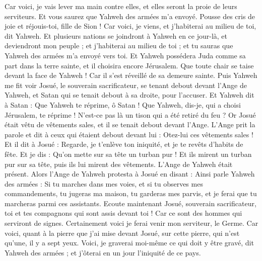 \begin{multicols}{2}
Car voici, je vais lever ma main contre elles, et elles seront la proie de leurs serviteurs. Et vous saurez que Yahweh des armées m'a envoyé.
Pousse des cris de joie et réjouis-toi, fille de Sion ! Car voici, je viens, et j'habiterai au milieu de toi, dit Yahweh.
Et plusieurs nations se joindront à Yahweh en ce jour-là, et deviendront mon peuple ; et j'habiterai au milieu de toi ; et tu sauras que Yahweh des armées m'a envoyé vers toi.
Et Yahweh possédera Juda comme sa part dans la terre sainte, et il choisira encore Jérusalem.
Que toute chair se taise devant la face de Yahweh ! Car il s'est réveillé de sa demeure sainte.
\VerseOne{}Puis Yahweh me fit voir Josué, le souverain sacrificateur, se tenant debout devant l'Ange de Yahweh, et Satan qui se tenait debout à sa droite, pour l'accuser.
Et Yahweh dit à Satan : Que Yahweh te réprime, ô Satan ! Que Yahweh, dis-je, qui a choisi Jérusalem, te réprime ! N'est-ce pas là un tison qui a été retiré du feu ?
Or Josué était vêtu de vêtements sales, et il se tenait debout devant l'Ange.
L'Ange prit la parole et dit à ceux qui étaient debout devant lui : Otez-lui ces vêtements sales ! Et il dit à Josué : Regarde, je t'enlève ton iniquité, et je te revêts d'habits de fête.
Et je dis : Qu'on mette sur sa tête un turban pur ! Et ils mirent un turban pur sur sa tête, puis ils lui mirent des vêtements. L'Ange de Yahweh était présent.
Alors l'Ange de Yahweh protesta à Josué en disant :
Ainsi parle Yahweh des armées : Si tu marches dans mes voies, et si tu observes mes commandements, tu jugeras ma maison, tu garderas mes parvis, et je ferai que tu marcheras parmi ces assistants.
Ecoute maintenant Josué, souverain sacrificateur, toi et tes compagnons qui sont assis devant toi ! Car ce sont des hommes qui serviront de signes. Certainement voici je ferai venir mon serviteur, le Germe.
Car voici, quant à la pierre que j'ai mise devant Josué, sur cette pierre, qui n'est qu'une, il y a sept yeux. Voici, je graverai moi-même ce qui doit y être gravé, dit Yahweh des armées ; et j'ôterai en un jour l'iniquité de ce pays.

\end{multicols}
